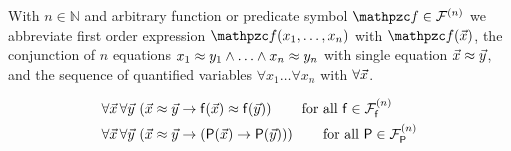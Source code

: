 \begin{definition}
	With $n\in\mathbb{N}$ and arbitrary function or predicate symbol 
	$\mcf\in\mcFn$ 
	we abbreviate first order expression
	$\mcf(x_1,\ldots,x_n)$ with $\mcf(\vecn{x})$,
	the conjunction of $n$ equations 
	$x_1\approx y_1\land\ldots\land x_n\approx y_n$ 
	with single equation $\vec{x}\approx\vec{y}$,
	and the sequence of quantified variables $\forall x_1\ldots\forall x_n$
	with $\forall\vec{x}$.
\end{definition}

\begin{definition}
	\label{def:congruence:schemata}
	\begin{align*}
	\forall\vecn{x}\,\forall\vecn{y}\,
	&\left(\vecn{x}\mEQ\vecn{y} \limp \mf(\vecn{x}) \mEQ \mf(\vecn{y}) \right)
	\tag*{for all $\mf\in\mcFfn$}
	\\
	\forall\vecn{x}\,\forall\vecn{y}\, 
	&\left(\vecn{x}\mEQ\vecn{y} \limp (\mP(\vecn{x}) \limp \mP(\vecn{y}))\right)
	\tag*{for all $\mP\in\mcFPn$}
	\end{align*}
	
	
\end{definition}


